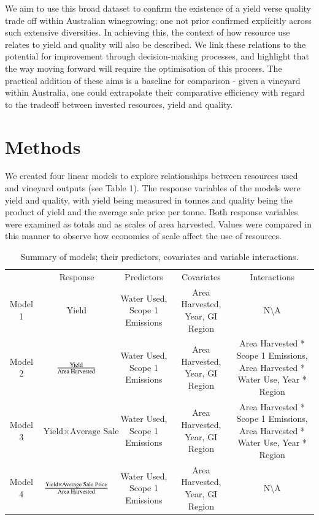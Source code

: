\documentclass[review,12pt,authoryear]{elsarticle}
\begin{document}
\begin{linenumbers}
We aim to use this broad dataset to confirm the existence of a yield verse quality trade off within Australian winegrowing; one not prior confirmed explicitly across such extensive diversities.
In achieving this, the context of how resource use relates to yield and quality will also be described. We link these relations to the potential for improvement through decision-making processes, and highlight that the way moving forward will require the optimisation of this process. The practical addition of these aims is a baseline for comparison - given a vineyard within Australia, one could extrapolate their comparative efficiency with regard to the tradeoff between invested resources, yield and quality.
\section{Methods}
We created four linear models to explore relationships between resources used and vineyard outputs (see Table 1). The response variables of the models were yield and quality, with yield being measured in tonnes and quality being the product of yield and the average sale price per tonne. Both response variables were examined as totals and as scales of area harvested. Values were compared in this manner to observe how economies of scale affect the use of resources.

\begin{table}[]
    \begin{center}
      \caption{Summary of models; their predictors, covariates and variable interactions.}
      \label{tab:tab1}
      \begin{tabular}{ccccc}
        & Response & Predictors & Covariates & Interactions \\
        Model 1 & Yield & Water Used, Scope 1 Emissions & Area Harvested, Year, GI Region & N\textbackslash A \\
        Model 2 & ${ \textrm{Yield}}\over{ \textrm{Area Harvested}}$ & Water Used, Scope 1 Emissions & Area Harvested, Year, GI Region & Area Harvested * Scope 1 Emissions, Area Harvested * Water Use, Year * Region \\
        Model 3 & \small{$\textrm{Yield} {\times} \textrm{Average Sale Price}$} &  Water Used, Scope 1 Emissions& Area Harvested, Year, GI Region & Area Harvested * Scope 1 Emissions, Area Harvested * Water Use, Year * Region  \\
        Model 4 & ${\textrm{Yield} \times \textrm{Average Sale Price}}\over{\textrm{Area Harvested}}$ & Water Used, Scope 1 Emissions & Area Harvested, Year, GI Region  & N\textbackslash A
      \end{tabular}
    \end{center}
\end{table}


\end{linenumbers}
\end{document}
